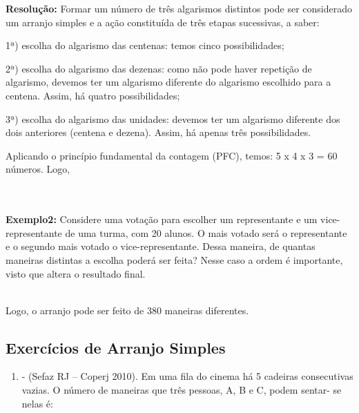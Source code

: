 \begin{multicols*}{2}
	\textbf{Resolução:} Formar um número de três algarismos distintos pode ser considerado um arranjo simples e a ação constituída de três etapas sucessivas, a saber:

	1ª) escolha do algarismo das centenas: temos cinco possibilidades;

	2ª) escolha do algarismo das dezenas: como não pode haver repetição de algarismo, devemos ter um algarismo diferente do algarismo escolhido para a centena. Assim, há quatro possibilidades;

	3ª) escolha do algarismo das unidades: devemos ter um algarismo diferente dos dois anteriores (centena e dezena). Assim, há apenas três possibilidades.

	Aplicando o princípio fundamental da contagem (PFC), temos: 5 x 4 x 3 = 60 números. Logo,

	\\

	\\

	\textbf{Exemplo2: } Considere uma votação para escolher um representante e um vice-representante de uma turma, com 20 alunos. O mais votado será o representante e o segundo mais votado o vice-representante. Dessa maneira, de quantas maneiras distintas a escolha poderá ser feita? Nesse caso a ordem é importante, visto que altera o resultado final.


	\\

	Logo, o arranjo pode ser feito de 380 maneiras diferentes.

	\subsection{Exercícios de Arranjo Simples}

	\begin{enumerate}

		\item - (Sefaz RJ – Coperj 2010). Em uma fila do cinema há 5 cadeiras consecutivas
		      vazias. O número de maneiras que três pessoas, A, B e C, podem sentar- se nelas é:


\end{enumerate}
\end{multicols*}
